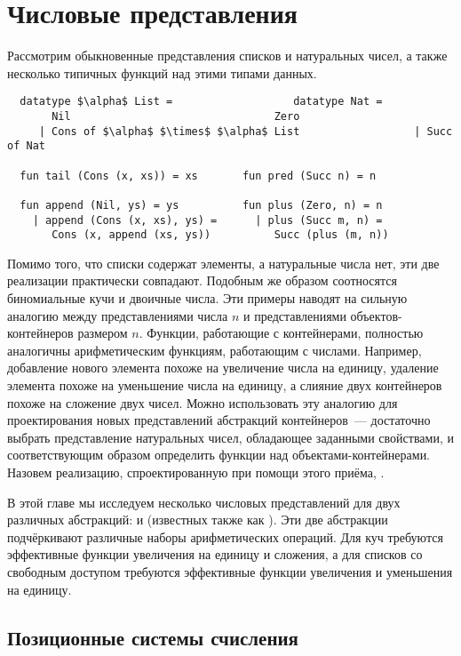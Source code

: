 \chapter{Числовые представления}
\label{ch:9}

Рассмотрим обыкновенные представления списков и натуральных чисел, а
также несколько типичных функций над этими типами данных.
\begin{lstlisting}
  datatype $\alpha$ List =                   datatype Nat =
       Nil                                Zero
     | Cons of $\alpha$ $\times$ $\alpha$ List                  | Succ of Nat

  fun tail (Cons (x, xs)) = xs       fun pred (Succ n) = n

  fun append (Nil, ys) = ys          fun plus (Zero, n) = n
    | append (Cons (x, xs), ys) =      | plus (Succ m, n) =
       Cons (x, append (xs, ys))          Succ (plus (m, n))
\end{lstlisting}
Помимо того, что списки содержат элементы, а натуральные числа нет,
эти две реализации практически совпадают. Подобным же образом
соотносятся биномиальные кучи и двоичные числа. Эти примеры наводят на
сильную аналогию между представлениями числа $n$ и представлениями
объектов-контейнеров размером $n$. Функции, работающие с контейнерами,
полностью аналогичны арифметическим функциям, работающим с
числами. Например, добавление нового элемента похоже на увеличение
числа на единицу, удаление элемента похоже на уменьшение числа на
единицу, а слияние двух контейнеров похоже на сложение двух
чисел. Можно использовать эту аналогию для проектирования новых
представлений абстракций контейнеров~--- достаточно выбрать
представление натуральных чисел, обладающее заданными свойствами, и
соответствующим образом определить функции над
объектами-контейнерами. Назовем реализацию, спроектированную при помощи
этого приёма, .

В этой главе мы исследуем несколько числовых представлений для двух
различных абстракций:  и  (известных также как ). Эти две абстракции подчёркивают различные наборы
арифметических операций. Для куч требуются эффективные функции
увеличения на единицу и сложения, а для списков со свободным доступом
требуются эффективные функции увеличения и уменьшения на единицу.

\section{Позиционные системы счисления}
\label{sc:9.1}

